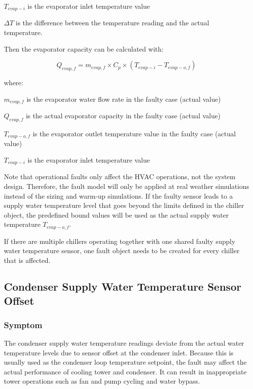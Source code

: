 \(T_{evap-i}\) is the evaporator inlet temperature value 

\(\Delta T\) is the difference between the temperature reading and the actual temperature.

Then the evaporator capacity can be calculated with:

\begin{equation}
Q_{evap,f} = m_{evap,f} \times C_p \times (T_{evap-i} - T_{evap-o,f} )
\end{equation}

where:

\(m_{evap,f}\) is the evaporator water flow rate in the faulty case (actual value)

\(Q_{evap,f}\) is the actual evaporator capacity in the faulty case (actual value)

\(T_{evap-o,f}\) is the evaporator outlet temperature value in the faulty case (actual value)

\(T_{evap-i}\) is the evaporator inlet temperature value 

Note that operational faults only affect the HVAC operations, not the system design. Therefore, the fault model will only be applied at real weather simulations instead of the sizing and warm-up simulations. If the faulty sensor leads to a supply water temperature level that goes beyond the limits defined in the chiller object, the predefined bound values will be used as the actual supply water temperature \(T_{evap-o,f}\).

If there are multiple chillers operating together with one shared faulty supply water temperature sensor, one fault object needs to be created for every chiller that is affected.


\subsection{Condenser Supply Water Temperature Sensor Offset}\label{condenser-supply-water-temperature-sensor-offset}

\subsubsection{Symptom}

The condenser supply water temperature readings deviate from the actual water temperature levels due to sensor offset at the condenser inlet. Because this is usually used as the condenser loop temperature setpoint, the fault may affect the actual performance of cooling tower and condenser. It can result in inappropriate tower operations such as fan and pump cycling and water bypass. 


